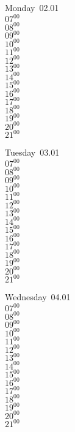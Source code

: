 \documentclass[11pt,a4paper]{book}\usepackage[]{graphicx}\usepackage[]{color}
\begin{document}
\begin{headerbox}
\end{headerbox}
\begin{weekdaybox}
  Monday~02.01\\
  { 
  \vfill
  $07^{00}$\\
$08^{00}$\\
$09^{00}$\\
$10^{00}$\\
$11^{00}$\\
$12^{00}$\\
$13^{00}$\\
$14^{00}$\\
$15^{00}$\\
$16^{00}$\\
$17^{00}$\\
$18^{00}$\\
$19^{00}$\\
$20^{00}$\\
$21^{00}$\\
  }
\end{weekdaybox}
\begin{weekdaybox}
  Tuesday~03.01\\
  { 
  \vfill
  $07^{00}$\\
$08^{00}$\\
$09^{00}$\\
$10^{00}$\\
$11^{00}$\\
$12^{00}$\\
$13^{00}$\\
$14^{00}$\\
$15^{00}$\\
$16^{00}$\\
$17^{00}$\\
$18^{00}$\\
$19^{00}$\\
$20^{00}$\\
$21^{00}$\\
  }
\end{weekdaybox}
\begin{weekdaybox}
  Wednesday~04.01\\
  { 
  \vfill
  $07^{00}$\\
$08^{00}$\\
$09^{00}$\\
$10^{00}$\\
$11^{00}$\\
$12^{00}$\\
$13^{00}$\\
$14^{00}$\\
$15^{00}$\\
$16^{00}$\\
$17^{00}$\\
$18^{00}$\\
$19^{00}$\\
$20^{00}$\\
$21^{00}$\\
  }
\end{weekdaybox}
\end{document}
